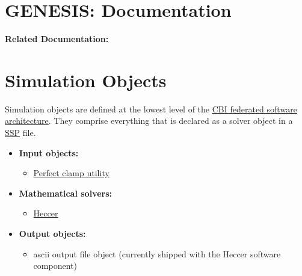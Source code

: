 \documentclass[12pt]{article}
\begin{document}
\section*{GENESIS: Documentation}

{\bf Related Documentation:}

\section*{Simulation Objects}

Simulation objects are defined at the lowest level of the \href{../genesis-overview/genesis-overview.tex}{CBI federated software architecture}. They comprise everything that is declared as a solver object in a \href{../ssp/ssp.tex}{SSP} file.

\begin{itemize}

\item {\bf Input objects:}
   \begin{itemize}
      \item \href{../pclamp/pclamp.tex}{Perfect clamp utility}
   \end{itemize}
   
\item{\bf Mathematical solvers:}
   \begin{itemize}
      \item \href{../heccer/heccer.tex}{Heccer}
   \end{itemize}
   
\item {\bf Output objects:}
   \begin{itemize}
      \item ascii output file object (currently shipped with the Heccer software component)
   \end{itemize}

\end{itemize}
\end{document}

